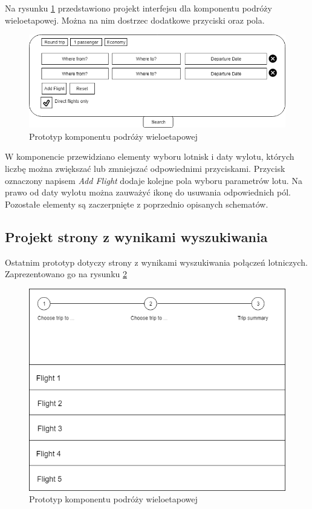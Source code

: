 \documentclass[12pt, twoside]{report}
\begin{document}
Na rysunku \ref{fig:multi_travel_interface} przedstawiono projekt interfejsu dla komponentu podróży wieloetapowej. Można na nim dostrzec dodatkowe przyciski oraz pola.
\begin{figure}[!ht]
\centering
\includegraphics[scale=0.60, keepaspectratio]{multi_travel_interface.PNG}
\caption{Prototyp komponentu podróży wieloetapowej}
\label{fig:multi_travel_interface}
\end{figure}
W komponencie przewidziano elementy wyboru lotnisk i daty wylotu, których liczbę można zwiększać lub zmniejszać odpowiednimi przyciskami. Przycisk oznaczony napisem \textit{Add Flight} dodaje kolejne pola wyboru parametrów lotu. Na prawo od daty wylotu można zauważyć ikonę do usuwania odpowiednich pól. Pozostałe elementy są zaczerpnięte z poprzednio opisanych schematów.
\subsection{Projekt strony z wynikami wyszukiwania}
Ostatnim prototyp dotyczy strony z wynikami wyszukiwania połączeń lotniczych. Zaprezentowano go na rysunku \ref{fig:result_interface}

\begin{figure}[!ht]
\centering
\includegraphics[scale=0.60, keepaspectratio]{result_interface.PNG}
\caption{Prototyp komponentu podróży wieloetapowej}
\label{fig:result_interface}
\end{figure}
\end{document}
